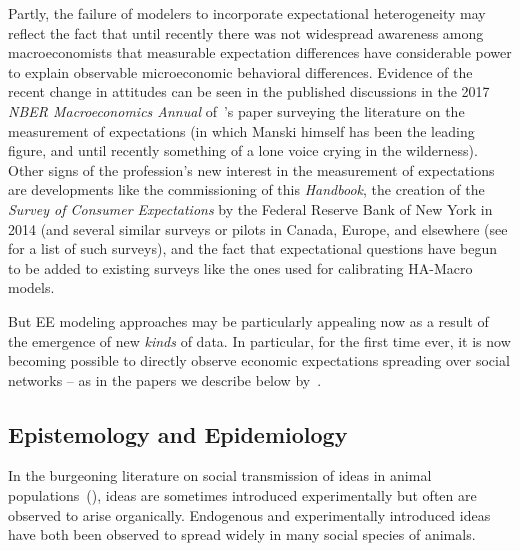 Partly, the failure of modelers to incorporate expectational heterogeneity may reflect the fact that until recently there was not widespread awareness among macroeconomists that measurable expectation differences have considerable power to explain observable microeconomic behavioral differences.  Evidence of the recent change in attitudes can be seen in the published discussions in the 2017 \textit{NBER Macroeconomics Annual} of~\cite{manski2017survey}'s paper surveying the literature on the measurement of expectations (in which Manski himself has been the leading figure, and until recently something of a lone voice crying in the wilderness).  %
Other signs of the profession's new interest in the measurement of expectations are developments like the commissioning of this \emph{Handbook}, the creation of the \emph{Survey of Consumer Expectations} by the Federal Reserve Bank of New York in 2014 (and several similar surveys or pilots in Canada, Europe, and elsewhere (see {\bdkhouseholdFull} for a list of such surveys), and the fact that expectational questions have begun to be added to existing surveys like the ones used for calibrating HA-Macro models.  %

But EE modeling approaches may be particularly appealing now as a result of the emergence of new \emph{kinds} of data.  In particular, for the first time ever, it is now becoming possible to directly observe economic expectations spreading over social networks -- as in the papers we describe below by~\cite{bailey2018economic, bailey2019house}.

\subsection{Epistemology and Epidemiology}

In the burgeoning literature on social transmission of ideas in animal populations~(\cite{whiten2021burgeoning}), ideas are sometimes introduced experimentally but often are observed to arise organically.  Endogenous and experimentally introduced ideas have both been observed to spread widely in many social species of animals.

